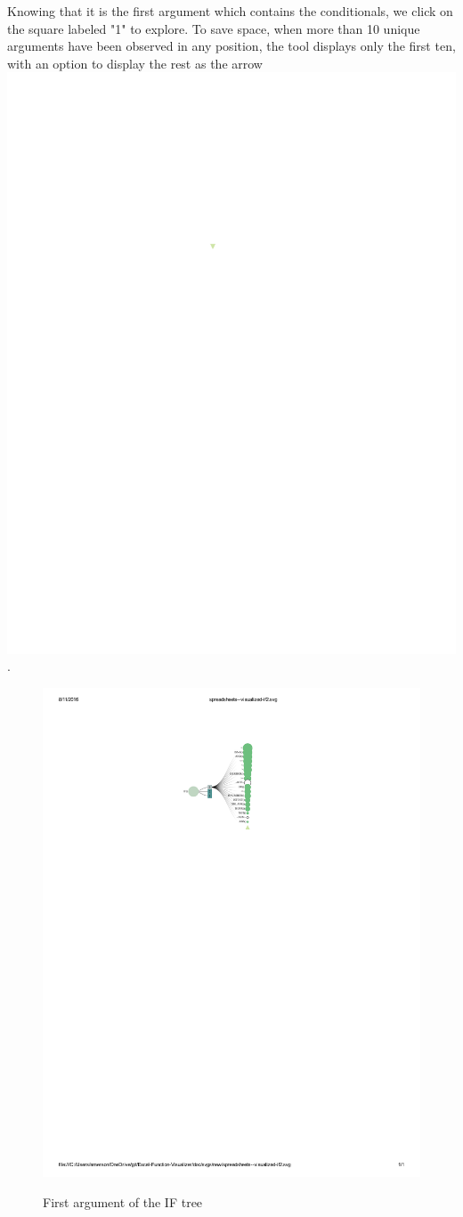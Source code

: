 \documentclass[conference]{IEEEtran}
\begin{document}
	Knowing that it is the first argument which contains the conditionals, we click
	on the square labeled "1" to explore. To save space, when more than 10 unique
	arguments have been observed in any position, the tool displays only the first
	ten, with an option to display the rest as the arrow \includegraphics{glossary-arrow}. 
	
	\begin{figure}[h]
		\centering
		\includegraphics[width=.43\textwidth]{IFexpand}
		\label{fig:expandif}
		\caption{First argument of the IF tree}
	\end{figure}
	
\end{document}
